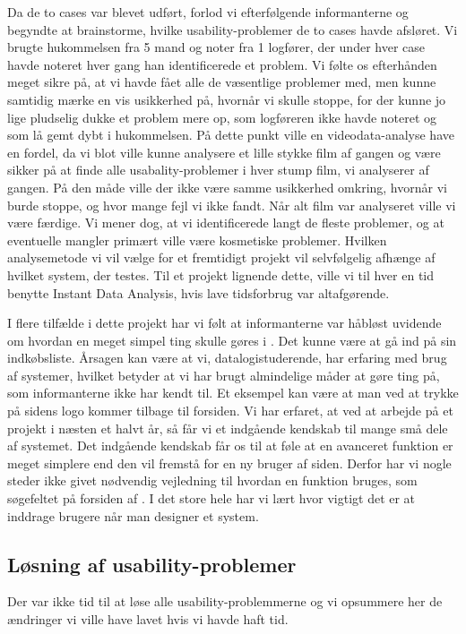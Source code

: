 Da de to cases var blevet udført, forlod vi efterfølgende informanterne og begyndte at brainstorme, hvilke usability-problemer de to cases havde afsløret. Vi brugte hukommelsen fra 5 mand og noter fra 1 logfører, der under hver case havde noteret hver gang han identificerede et problem. Vi følte os efterhånden meget sikre på, at vi havde fået alle de væsentlige problemer med, men kunne samtidig mærke en vis usikkerhed på, hvornår vi skulle stoppe, for der kunne jo lige pludselig dukke et problem mere op, som logføreren ikke havde noteret og som lå gemt dybt i hukommelsen. På dette punkt ville en videodata-analyse have en fordel, da vi blot ville kunne analysere et lille stykke film af gangen og være sikker på at finde alle usabality-problemer i hver stump film, vi analyserer af gangen. På den måde ville der ikke være samme usikkerhed omkring, hvornår vi burde stoppe, og hvor mange fejl vi ikke fandt. Når alt film var analyseret ville vi være færdige. Vi mener dog, at vi identificerede langt de fleste problemer, og at eventuelle mangler primært ville være kosmetiske problemer. Hvilken analysemetode vi vil vælge for et fremtidigt projekt vil selvfølgelig afhænge af hvilket system, der testes. Til et projekt lignende dette, ville vi til hver en tid benytte Instant Data Analysis, hvis lave tidsforbrug var altafgørende.

I flere tilfælde i dette projekt har vi følt at informanterne var håbløst uvidende om hvordan en meget simpel ting skulle gøres i \Foodl. Det kunne \fx være at gå ind på sin indkøbsliste. Årsagen kan være at vi, datalogistuderende, har erfaring med brug af systemer, hvilket betyder at vi har brugt almindelige måder at gøre ting på, som informanterne ikke har kendt til. Et eksempel kan være at man ved at trykke på sidens logo kommer tilbage til forsiden.
Vi har erfaret, at ved at arbejde på et projekt i næsten et halvt år, så får vi et indgående kendskab til mange små dele af systemet. Det indgående kendskab får os til at føle at en avanceret funktion er meget simplere end den vil fremstå for en ny bruger af siden. Derfor har vi nogle steder ikke givet nødvendig vejledning til hvordan en funktion bruges, som \fx søgefeltet på forsiden af \Foodl. I det store hele har vi lært hvor vigtigt det er at inddrage brugere når man designer et system.


\subsection{Løsning af usability-problemer}
Der var ikke tid til at løse alle usability-problemmerne og vi opsummere her de ændringer vi ville have lavet hvis vi havde haft tid.

